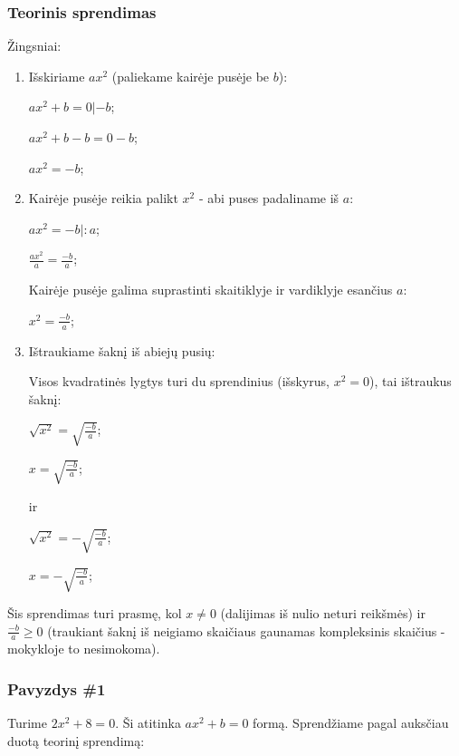 \documentclass[a4paper]{article}
\begin{document}
\subsubsection{Teorinis sprendimas}

Žingsniai:
\begin{enumerate}

      \item  Išskiriame $ ax^{2} $ (paliekame kairėje pusėje be $ b $):

            $ ax^{2}+b=0 | -b $;

            $ ax^{2}+b-b=0-b $;

            $ ax^{2}=-b $;

      \item Kairėje pusėje reikia palikt $ x^2 $ - abi puses padaliname iš $ a
            $:

            $ ax^{2}=-b |:a $;

            $ \frac{ax^{2}}{a}=\frac{-b}{a}$;

            Kairėje pusėje galima suprastinti skaitiklyje ir vardiklyje
            esančius
            $ a $:

            $ x^{2}=\frac{-b}{a}$;

      \item Ištraukiame šaknį iš abiejų pusių:

            Visos kvadratinės lygtys turi du sprendinius (išskyrus, $ x^2=0 $),
            tai ištraukus šaknį:

            $ \sqrt{x^{2}}=\sqrt{\frac{-b}{a}}$;

            $ x=\sqrt{\frac{-b}{a}}$;

            ir

            $ \sqrt{x^{2}}=-\sqrt{\frac{-b}{a}}$;

            $ x=-\sqrt{\frac{-b}{a}}$;

\end{enumerate}

Šis sprendimas turi prasmę, kol $ x \neq 0 $ (dalijimas iš nulio neturi
reikšmės) ir $ \frac{-b}{a} \ge 0 $ (traukiant šaknį iš neigiamo skaičiaus
gaunamas kompleksinis skaičius - mokykloje to nesimokoma).

\subsubsection{Pavyzdys \#1}

Turime $ 2x^{2}+8=0 $. Ši atitinka $ ax^{2}+b=0 $ formą. Sprendžiame pagal
auksčiau duotą teorinį sprendimą:
\end{document}
